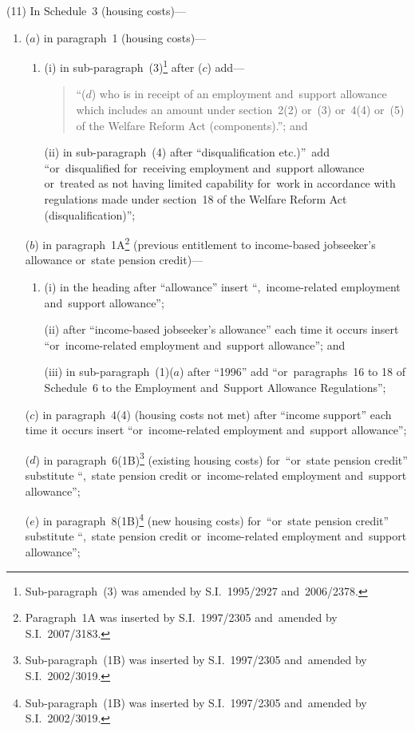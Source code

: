 \documentclass[12pt,a4paper]{article}
\begin{document}
(11) In Schedule~3 (housing costs)—
\begin{enumerate}\item[]
($a$) in paragraph~1 (housing costs)—
\begin{enumerate}\item[]
(i) in sub-paragraph~(3)\footnote{Sub-paragraph~(3) was amended by S.I.~1995/2927 and~2006/2378.} after ($c$)  add—
\begin{quotation}
“($d$) who is in receipt of an employment and~support allowance which includes an amount under section~2(2) or~(3) or~4(4) or~(5) of the Welfare Reform Act (components).”; and
\end{quotation}

(ii) in sub-paragraph~(4) after “disqualification etc.)”\ add “or~disqualified for~receiving employment and~support allowance or~treated as not having limited capability for~work in accordance with regulations made under section~18 of the Welfare Reform Act (disqualification)”;
\end{enumerate}

($b$) in paragraph~1A\footnote{Paragraph~1A was inserted by S.I.~1997/2305 and~amended by S.I.~2007/3183.} (previous entitlement to income-based jobseeker’s allowance or~state pension credit)—
\begin{enumerate}\item[]
(i) in the heading after “allowance” insert “,~income-related employment and~support allowance”;

(ii) after “income-based jobseeker’s allowance” each time it occurs insert “or~income-related employment and~support allowance”; and

(iii) in sub-paragraph~(1)($a$)  after “1996” add “or~paragraphs~16 to 18 of Schedule~6 to the Employment and~Support Allowance Regulations”;
\end{enumerate}

($c$) in paragraph~4(4) (housing costs not met) after “income support” each time it occurs insert “or~income-related employment and~support allowance”;

($d$) in paragraph~6(1B)\footnote{Sub-paragraph~(1B) was inserted by S.I.~1997/2305 and~amended by S.I.~2002/3019.} (existing housing costs) for~“or~state pension credit” substitute “,~state pension credit or~income-related employment and~support allowance”;

($e$) in paragraph~8(1B)\footnote{Sub-paragraph~(1B) was inserted by S.I.~1997/2305 and~amended by S.I.~2002/3019.} (new housing costs) for~“or~state pension credit” substitute “,~state pension credit or~income-related employment and~support allowance”;


\end{enumerate}
\end{document}
